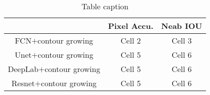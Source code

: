\begin{table}[t]
\begin{center}
\caption{Table caption} \label{tab:report1}
\begin{tabular}{|c|c|c|}
  \hline
   & Pixel Accu. & Neab IOU
  \\
  \hline
  FCN$+$contour growing & Cell 2 & Cell 3 \\
  Unet$+$contour growing & Cell 5 & Cell 6 \\
  DeepLab$+$contour growing & Cell 5 & Cell 6 \\
  Resnet$+$contour growing & Cell 5 & Cell 6 \\
  \hline
\end{tabular}
\end{center}
\end{table}



